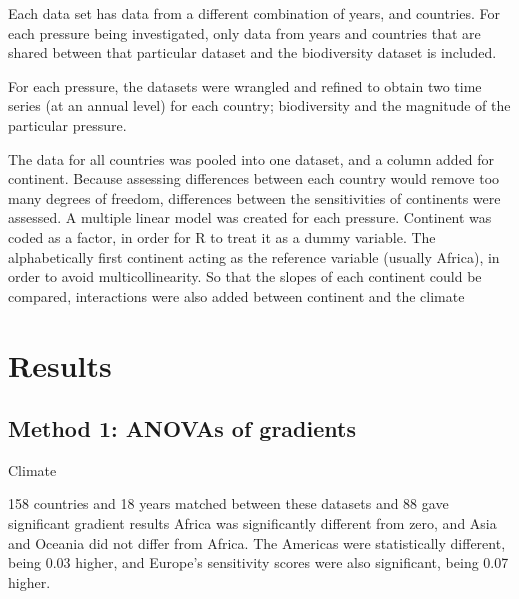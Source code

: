 \documentclass[11pt, a4paper, titlepage]{article}
\begin{document}
Each data set has data from a different combination of years, and countries. For each pressure being investigated, only data from years and countries that are shared between that particular dataset and the biodiversity dataset is included. \newline

For each pressure, the datasets were wrangled and refined to obtain two time series (at an annual level) for each country; biodiversity and the magnitude of the particular pressure. 

The data for all countries was pooled into one dataset, and a column added for continent. Because assessing differences between each country would remove too many degrees of freedom, differences between the sensitivities of continents were assessed. A multiple linear model was created for each pressure. Continent was coded as a factor, in order for R to treat it as a dummy variable. The alphabetically first continent acting as the reference variable (usually Africa), in order to avoid multicollinearity. So that the slopes of each continent could be compared, interactions were also added between continent and the climate \newline


	

	
	
	
		
	 
	
	
	

	\clearpage

	 \section*{Results}
	 
	\subsection*{Method 1: ANOVAs of gradients}
	
	Climate \newline
	
	158 countries and 18 years matched between these datasets and 88 gave significant gradient results \newline
	Africa was significantly different from zero, and Asia and Oceania did not differ from Africa. The Americas were statistically different, being 0.03 higher, and Europe's sensitivity scores were also significant, being 0.07 higher. 
	
\end{document}
